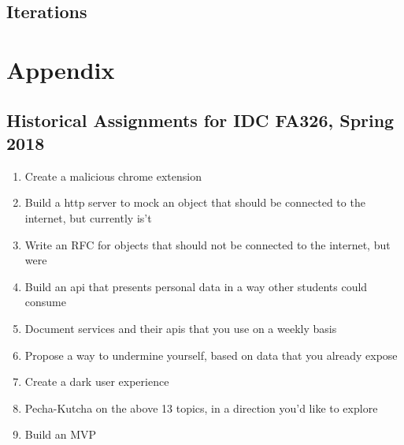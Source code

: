 \documentclass[12pt]{article}
\begin{document}
\newpage


\subsection{Iterations}



\section*{Appendix}
\subsection*{Historical Assignments for IDC FA326, Spring 2018 \cite{PINNED-TWEET}} 
\begin{enumerate}
    \item Create a malicious chrome extension
    \item Build a http server to mock an object that should be connected to the internet, but currently is't
    \item Write an RFC for objects that should not be connected to the internet, but were
    \item Build an api that presents personal data in a way other students could consume
    \item Document services and their apis that you use on a weekly basis
    \item Propose a way to undermine yourself, based on data that you already expose
    \item Create a dark user experience
    \item Pecha-Kutcha on the above 13 topics, in a direction you'd like to explore
    \item Build an MVP
\end{enumerate}



 
\end{document}
